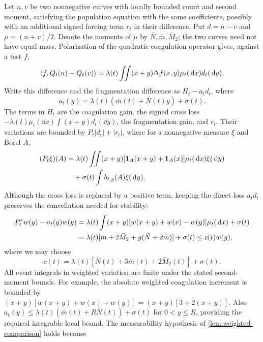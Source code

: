 Let $n,v$ be two nonnegative curves with locally bounded count and second
moment, satisfying the population equation with the same coefficients,
possibly with an additional signed forcing term $r_t$ in their difference.
Put $d=n-v$ and $\mu=(n+v)/2$. Denote the moments of $\mu$ by
$\bar N,\bar m,\bar M_2$; the two curves need not have equal mass.
Polarization of the quadratic coagulation operator gives, against a test
$f$,
\begin{equation}
 \langle f,Q_t(n)-Q_t(v)\rangle
 =\lambda(t)\iint (x+y)\Delta f(x,y)\mu_t(\,\mathrm d x)d_t(\,\mathrm d y).
 \label{eq:polarization}
\end{equation}
Write this difference and the fragmentation difference as
$H_t-a_td_t$, where
\begin{equation}
 a_t(y)=\lambda(t)(\bar m(t)+\bar N(t)y)+\sigma(t).
 \label{eq:comparison-loss}
\end{equation}
The terms in $H_t$ are the coagulation gain, the signed cross loss
$-\lambda(t)\mu_t(\dd x)\int(x+y)d_t(\dd y)$, the fragmentation gain,
and $r_t$. Their variations are bounded by $P_t|d_t|+|r_t|$, where
for a nonnegative measure $\xi$ and Borel $A$,
\begin{align}
 (P_t\xi)(A)
 &=\lambda(t)\iint(x+y)
       [\mathbf 1_A(x+y)+\mathbf 1_A(x)]\mu_t(\,\mathrm d x)\xi(\,\mathrm d y)\notag\\
 &\quad+\sigma(t)\int b_{t,y}(A)\xi(\,\mathrm d y).
 \label{eq:positive-comparison}
\end{align}
Although the cross loss is replaced by a positive term, keeping the
direct loss $a_td_t$ preserves the cancellation needed for stability:
\begin{align}
 P_t^*w(y)-a_t(y)w(y)
 &=\lambda(t)\int(x+y)[w(x+y)+w(x)-w(y)]\mu_t(\,\mathrm d x)
       +\sigma(t)\notag\\
 &=\lambda(t)[\bar m+2\bar M_2+y(\bar N+2\bar m)]+\sigma(t)
 \leq c(t)w(y),\label{eq:weight-cancellation}
\end{align}
where we may choose
\begin{equation}
 c(t)=\lambda(t)[\bar N(t)+3\bar m(t)+2\bar M_2(t)]+\sigma(t).
 \label{eq:stability-coefficient}
\end{equation}
All event integrals in weighted variation are finite under the stated
second-moment bounds. For example, the absolute weighted coagulation
increment is bounded by
$(x+y)[w(x+y)+w(x)+w(y)]=(x+y)[3+2(x+y)]$.
Also $a_t(y)\leq\lambda(t)(\bar m(t)+R\bar N(t))+\sigma(t)$ for
$0<y\leq R$, providing the required integrable local bound. The
measurability hypothesis of \cref{lem:weighted-comparison} holds because
